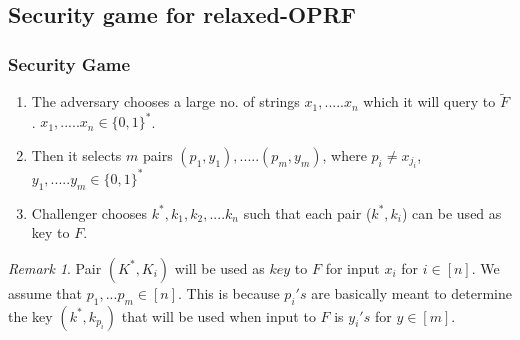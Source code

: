 \documentclass[hyperref={pdfpagelabels=false}]{beamer}
\theoremstyle{remark}
\newtheorem*{remark}{Remark}
\begin{document}
\subsection{Security game for relaxed-OPRF}
\begin{frame}
\frametitle{Security Game}
\begin{enumerate}
\item The adversary chooses a large no. of strings $x_1,.....x_n$ which it will query to $\widetilde{F}$. $x_1,.....x_n \in \{0,1\}^*$.\pause
\item Then it selects $m$ pairs $(p_1,y_1),.....(p_m,y_m)$, where $p_i \neq x_{j_i}$, $y_1,.....y_m \in \{0,1\}^*$\pause
\item Challenger chooses $k^*, k_1, k_2, ....k_n$ such that each pair ($k^*,k_i$) can be used as key to $F$.\pause

\end{enumerate}

\begin{remark}
Pair $(K^*,K_i)$ will be used as $key$ to $F$ for input $x_i$ for $i \in \left[n\right] $.
We assume that $p_1,...p_m \in \left[n\right]$. This is because $p_i's$ are basically meant to determine the key $(k^*,k_{p_i})$ that will be used when  input to $F$ is $y_i's$ for $y \in \left[m\right]$.
\end{remark}

\end{frame}
\end{document}

